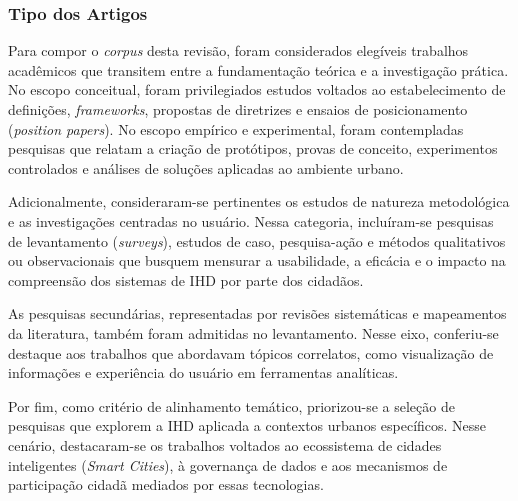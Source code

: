 \documentclass[
	12pt,				%
	oneside,			%
	a4paper,			%
	english,			%
	brazil				%
	]{abntex2ppgsi}
\begin{document}
    \subsubsection{Tipo dos Artigos}

    Para compor o \textit{corpus} desta revisão, foram considerados elegíveis trabalhos acadêmicos que transitem entre a fundamentação teórica e a investigação prática. No escopo conceitual, foram privilegiados estudos voltados ao estabelecimento de definições, \textit{frameworks}, propostas de diretrizes e ensaios de posicionamento (\textit{position papers}). No escopo empírico e experimental, foram contempladas pesquisas que relatam a criação de protótipos, provas de conceito, experimentos controlados e análises de soluções aplicadas ao ambiente urbano.

    Adicionalmente, consideraram-se pertinentes os estudos de natureza metodológica e as investigações centradas no usuário. Nessa categoria, incluíram-se pesquisas de levantamento (\textit{surveys}), estudos de caso, pesquisa-ação e métodos qualitativos ou observacionais que busquem mensurar a usabilidade, a eficácia e o impacto na compreensão dos sistemas de IHD por parte dos cidadãos.

   As pesquisas secundárias, representadas por revisões sistemáticas e mapeamentos da literatura, também foram admitidas no levantamento. Nesse eixo, conferiu-se destaque aos trabalhos que abordavam tópicos correlatos, como visualização de informações e experiência do usuário em ferramentas analíticas.

    Por fim, como critério de alinhamento temático, priorizou-se a seleção de pesquisas que explorem a IHD aplicada a contextos urbanos específicos. Nesse cenário, destacaram-se os trabalhos voltados ao ecossistema de cidades inteligentes (\textit{Smart Cities}), à governança de dados e aos mecanismos de participação cidadã mediados por essas tecnologias.
    

\end{document}
